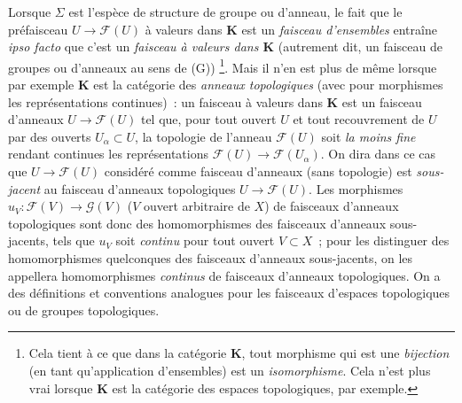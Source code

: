 \begin{env}[3.1.4]
\label{0.3.1.4-fr}
Lorsque $\Sigma$ est l'espèce de structure de groupe ou d'anneau, le fait que
le préfaisceau $U\to\mathcal{F}(U)$ à valeurs dans $\mathbf{K}$ est un
\emph{faisceau d'ensembles} entraîne \emph{ipso facto} que c'est un
\emph{faisceau à valeurs dans $\mathbf{K}$} (autrement dit, un faisceau de
groupes ou d'anneaux au sens de (G))%
\footnote{Cela tient à ce que dans la catégorie $\mathbf{K}$, tout morphisme
qui est une \emph{bijection} (en tant qu'application d'ensembles) est un
\emph{isomorphisme}. Cela n'est plus vrai lorsque $\mathbf{K}$ est la
catégorie des espaces topologiques, par exemple.}. Mais il n'en est plus de
même lorsque par exemple $\mathbf{K}$ est la catégorie des \emph{anneaux
topologiques} (avec pour morphismes les représentations continues)~: un
faisceau à valeurs dans $\mathbf{K}$ est un faisceau d'anneaux
$U\to\mathcal{F}(U)$ tel que, pour tout ouvert $U$ et tout recouvrement de $U$
par des ouverts $U_\alpha\subset U$, la topologie de l'anneau $\mathcal{F}(U)$
soit \emph{la moins fine} rendant continues les représentations
$\mathcal{F}(U)\to\mathcal{F}(U_\alpha)$. On dira dans ce cas que
$U\to\mathcal{F}(U)$ considéré comme faisceau d'anneaux (sans topologie) est
\emph{sous-jacent} au faisceau d'anneaux topologiques
$U\to\mathcal{F}(U)$. Les morphismes
$u_V:\mathcal{F}(V)\to\mathcal{G}(V)$ ($V$ ouvert arbitraire de $X$) de
faisceaux d'anneaux topologiques sont donc des homomorphismes des faisceaux
d'anneaux sous-jacents, tels que $u_V$ soit \emph{continu} pour tout ouvert
$V\subset X$~; pour les distinguer des homomorphismes quelconques des
faisceaux d'anneaux sous-jacents, on les appellera homomorphismes
\emph{continus} de faisceaux d'anneaux topologiques. On a des définitions et
conventions analogues pour les faisceaux d'espaces topologiques ou de groupes
topologiques.
\end{env}

